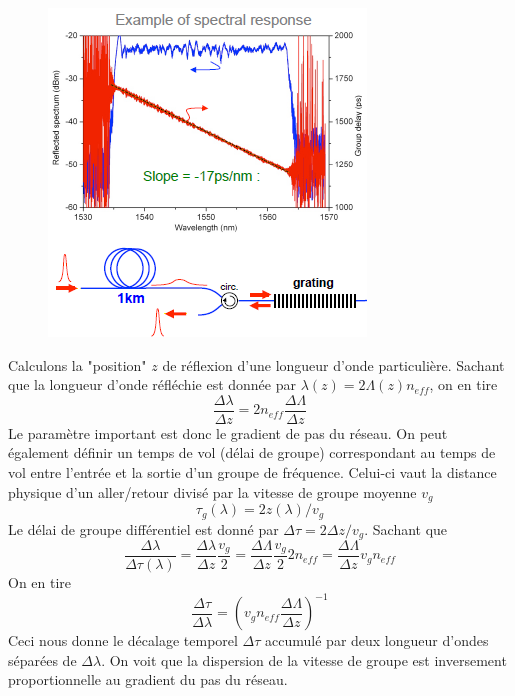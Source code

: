 	\begin{figure}
	\vspace{-5mm}
	\includegraphics[scale=0.6]{ch3/image16}
	\end{figure}
Calculons la "position" $z$ de réflexion d'une longueur d'onde particulière. Sachant que la longueur
d'onde réfléchie est donnée par $\lambda (z) = 2\Lambda (z){n_{eff}}$, on en tire
\begin{equation}
\frac{{\Delta \lambda }}{{\Delta z}} = 2{n_{eff}}\frac{{\Delta \Lambda }}{{\Delta z}}
\end{equation}
Le paramètre important est donc le gradient de pas du réseau. On peut également définir un temps
de vol (délai de groupe) correspondant au temps de vol entre l'entrée et la sortie d'un groupe
de fréquence. Celui-ci vaut la distance physique d'un aller/retour divisé par la vitesse de groupe
moyenne $v_g$
\begin{equation}
{\tau _g}(\lambda ) = 2z(\lambda )/{v_g}
\end{equation}
Le délai de groupe différentiel est donné par $\Delta \tau  = 2\Delta z/{v_g}$. Sachant que
\begin{equation}
\frac{{\Delta \lambda }}{{\Delta \tau (\lambda )}} = \frac{{\Delta \lambda }}{{\Delta z}}\frac{{{v_g}}}{2} = \frac{{\Delta \Lambda }}{{\Delta z}}\frac{{{v_g}}}{2}2{n_{eff}} = \frac{{\Delta \Lambda }}{{\Delta z}}{v_g}{n_{eff}}
\end{equation}
On en tire 
\begin{equation}
\frac{{\Delta \tau }}{{\Delta \lambda }} = {\left( {{v_g}{n_{eff}}\frac{{\Delta \Lambda }}{{\Delta z}}} \right)^{ - 1}}
\end{equation}
Ceci nous donne le décalage temporel $\Delta \tau$ accumulé par deux longueur d'ondes séparées de
$\Delta \lambda$. On voit que la dispersion de la vitesse de groupe est inversement proportionnelle
au gradient du pas du réseau. 


